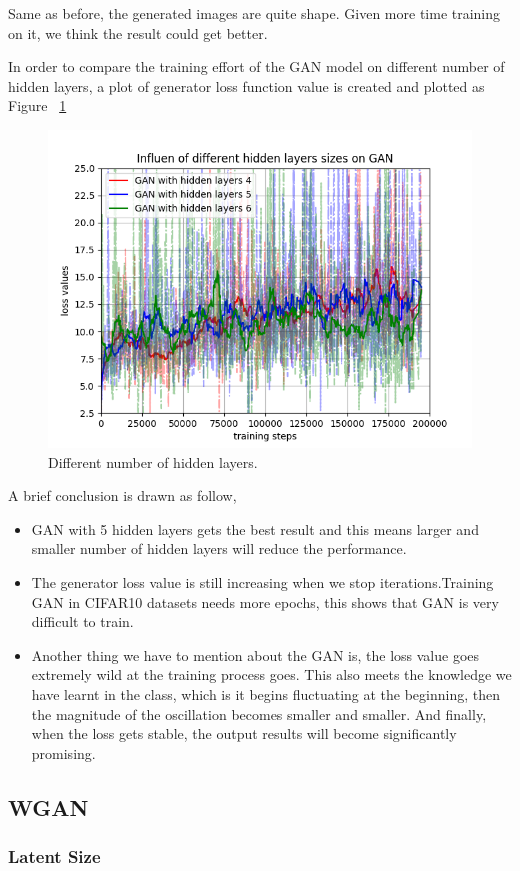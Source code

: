 \documentclass[12pt,letterpaper]{article}
\begin{document}
Same as before, the generated images are quite shape. Given more time training on it, we think the result could get better.

In order to compare the training effort of the GAN model on different number of hidden layers, a plot of generator loss function value is created and plotted as Figure ~\ref{fig:gen_hidden_CIFAR}
\begin{figure}[h]
    \centering
    \includegraphics[width=.5\linewidth]{GAN_CIFAR_hidden.png}
    \caption{\small Different number of hidden layers.}
    \label{fig:gen_hidden_CIFAR}
\end{figure}



A brief conclusion is drawn as follow,
\begin{itemize}
    \item GAN with 5 hidden layers gets the best result and this means larger and smaller number of hidden layers will reduce the performance.
    \item The generator loss value is still increasing when we stop iterations.Training GAN in CIFAR10 datasets needs more epochs, this shows that GAN is very difficult to train.
    \item Another thing we have to mention about the GAN is, the loss value goes extremely wild at the training process goes. This also meets the knowledge we have learnt in the class, which is it begins fluctuating at the beginning, then the magnitude of the oscillation becomes smaller and smaller. And finally, when the loss gets stable, the output results will become significantly promising.
\end{itemize}

\subsection{WGAN}

\subsubsection{Latent Size}
\end{document}
